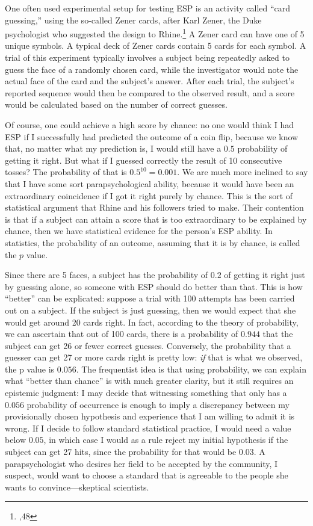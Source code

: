 One often used experimental setup for testing ESP is an activity called
``card guessing,'' using the so-called Zener cards, after Karl Zener, the
Duke psychologist who suggested the design to Rhine.\footnote{\cite{rhineesp},48} A Zener card can have one of 5
unique symbols. A typical deck of Zener cards contain 5 cards for each
symbol. A trial of this experiment typically involves a subject
being repeatedly asked to guess the face of a randomly chosen card,
while the investigator would note the actual face of the card and the
subject's answer. After each trial, the subject's reported sequence would then be
compared to the observed result, and a score would be calculated based
on the number of correct guesses.

Of course, one could achieve a high score by chance: no one would think
I had ESP if I successfully had predicted the outcome of a coin flip,
because we know that, no matter what my prediction is, I would still
have a \(0.5\) probability of getting it right. But what if I guessed
correctly the result of 10 consecutive tosses? The probability of that
is \(0.5^{10} = 0.001\). We are much more inclined to say that I have
some sort parapsychological ability, because it would have been an extraordinary
coincidence if I got it right purely by chance. This is the sort of
statistical argument that Rhine and his followers tried to make. Their
contention is that if a subject can attain a score that is too
extraordinary to be explained by chance, then we have statistical
evidence for the person's ESP ability. In statistics, the probability of
an outcome, assuming that it is by chance, is called the $p$ value.

Since there are 5 faces, a subject has the probability of \(0.2\) of
getting it right just by guessing alone, so someone with ESP should do
better than that. This is how ``better'' can be explicated: suppose a trial with 100 attempts has been carried out on a
subject. If the subject is just guessing, then we would expect that she
would get around 20 cards right. In fact, according to the theory of probability, we can ascertain that out of 100 cards, there is a
probability of \(0.944\) that the subject can get 26 or fewer correct
guesses. Conversely, the probability that a guesser can get 27 or more
cards right is pretty low: \emph{if} that is what we observed, the p value is \(0.056\). The frequentist idea is that using probability, we can explain what ``better than chance'' is with much greater clarity, but it still requires an epistemic judgment: I may decide that witnessing something that only has a $0.056$ probability of occurrence is enough to imply a discrepancy between my provisionally chosen hypothesis and experience that I am willing to admit it is wrong. If I decide to follow standard statistical practice, I would need a value below $0.05$, in which case I would as a rule reject my initial hypothesis if the subject can get 27 hits, since the probability for that would be $0.03$. A parapsychologist who desires her field to be accepted by the community, I suspect, would want to choose a standard that is agreeable to the people she wants to convince---skeptical scientists.

